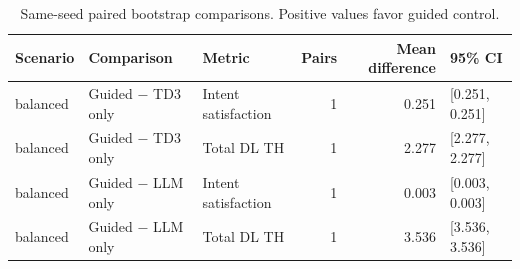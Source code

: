 \begin{table}[t]
\centering
\caption{Same-seed paired bootstrap comparisons. Positive values favor guided control.}
\label{tab:paired-results}
\begin{tabular}{lllrrl}
\toprule
Scenario & Comparison & Metric & Pairs & Mean difference & 95\% CI\\
\midrule
balanced & Guided $-$ TD3 only & Intent satisfaction & 1 & 0.251 & [0.251, 0.251] \\
balanced & Guided $-$ TD3 only & Total DL TH & 1 & 2.277 & [2.277, 2.277] \\
balanced & Guided $-$ LLM only & Intent satisfaction & 1 & 0.003 & [0.003, 0.003] \\
balanced & Guided $-$ LLM only & Total DL TH & 1 & 3.536 & [3.536, 3.536] \\
\bottomrule
\end{tabular}
\end{table}
